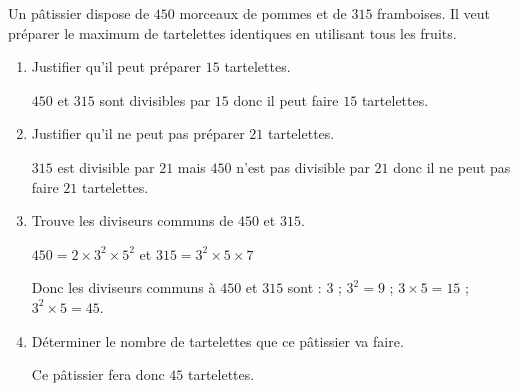    Un pâtissier dispose de $450$ morceaux de pommes et de $315$ framboises.
    Il veut préparer le maximum de tartelettes identiques en utilisant tous les fruits.

    \begin{enumerate}
        \item Justifier qu'il peut préparer $15$ tartelettes.

        {\color{red} $450$ et $315$ sont divisibles par $15$ donc il peut faire $15$ tartelettes.}
        \item Justifier qu'il ne peut pas préparer $21$ tartelettes.

        {\color{red} $315$ est divisible par $21$ mais $450$ n'est pas divisible par $21$ donc il ne peut pas faire $21$ tartelettes.}
        \item Trouve les diviseurs communs de $450$ et $315$.

        {\color{red} $450 = 2\times 3^2\times 5^2$ et $315=3^2\times 5\times 7$

        Donc les diviseurs communs à $450$ et $315$ sont : $3$ ; $3^2=9$ ; $3\times 5 = 15$ ; $3^2\times 5 = 45$.
        }
        \item Déterminer le nombre de tartelettes que ce pâtissier va faire.

        {\color{red} Ce pâtissier fera donc $45$ tartelettes.}
    \end{enumerate}
